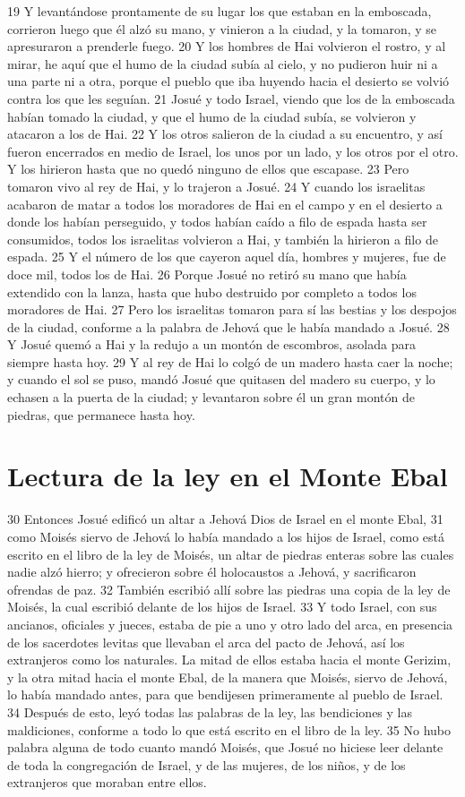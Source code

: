19 Y levantándose prontamente de su lugar los que estaban en la emboscada, corrieron luego que él alzó su mano, y vinieron a la ciudad, y la tomaron, y se apresuraron a prenderle fuego.
20 Y los hombres de Hai volvieron el rostro, y al mirar, he aquí que el humo de la ciudad subía al cielo, y no pudieron huir ni a una parte ni a otra, porque el pueblo que iba huyendo hacia el desierto se volvió contra los que les seguían.
21 Josué y todo Israel, viendo que los de la emboscada habían tomado la ciudad, y que el humo de la ciudad subía, se volvieron y atacaron a los de Hai.
22 Y los otros salieron de la ciudad a su encuentro, y así fueron encerrados en medio de Israel, los unos por un lado, y los otros por el otro. Y los hirieron hasta que no quedó ninguno de ellos que escapase.
23 Pero tomaron vivo al rey de Hai, y lo trajeron a Josué.
24 Y cuando los israelitas acabaron de matar a todos los moradores de Hai en el campo y en el desierto a donde los habían perseguido, y todos habían caído a filo de espada hasta ser consumidos, todos los israelitas volvieron a Hai, y también la hirieron a filo de espada.
25 Y el número de los que cayeron aquel día, hombres y mujeres, fue de doce mil, todos los de Hai.
26 Porque Josué no retiró su mano que había extendido con la lanza, hasta que hubo destruido por completo a todos los moradores de Hai.
27 Pero los israelitas tomaron para sí las bestias y los despojos de la ciudad, conforme a la palabra de Jehová que le había mandado a Josué.
28 Y Josué quemó a Hai y la redujo a un montón de escombros, asolada para siempre hasta hoy.
29 Y al rey de Hai lo colgó de un madero hasta caer la noche; y cuando el sol se puso, mandó Josué que quitasen del madero su cuerpo, y lo echasen a la puerta de la ciudad; y levantaron sobre él un gran montón de piedras, que permanece hasta hoy.
\section*{Lectura de la ley en el Monte Ebal}

30 Entonces Josué edificó un altar a Jehová Dios de Israel en el monte Ebal,
31 como Moisés siervo de Jehová lo había mandado a los hijos de Israel, como está escrito en el libro de la ley de Moisés, un altar de piedras enteras sobre las cuales nadie alzó hierro; y ofrecieron sobre él holocaustos a Jehová, y sacrificaron ofrendas de paz.
32 También escribió allí sobre las piedras una copia de la ley de Moisés, la cual escribió delante de los hijos de Israel. 
33 Y todo Israel, con sus ancianos, oficiales y jueces, estaba de pie a uno y otro lado del arca, en presencia de los sacerdotes levitas que llevaban el arca del pacto de Jehová, así los extranjeros como los naturales. La mitad de ellos estaba hacia el monte Gerizim, y la otra mitad hacia el monte Ebal, de la manera que Moisés, siervo de Jehová, lo había mandado antes, para que bendijesen primeramente al pueblo de Israel.
34 Después de esto, leyó todas las palabras de la ley, las bendiciones y las maldiciones, conforme a todo lo que está escrito en el libro de la ley.
35 No hubo palabra alguna de todo cuanto mandó Moisés, que Josué no hiciese leer delante de toda la congregación de Israel, y de las mujeres, de los niños, y de los extranjeros que moraban entre ellos. 

